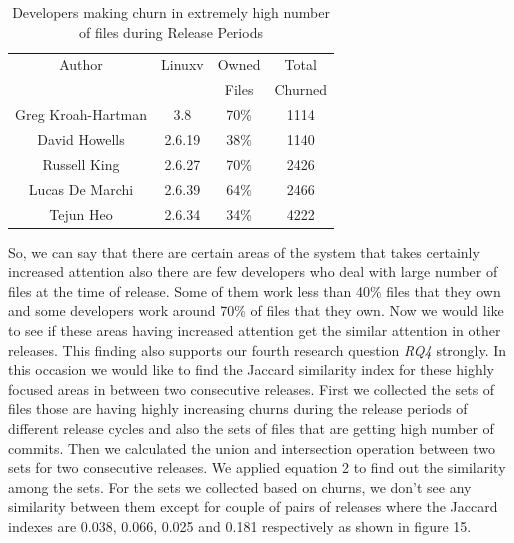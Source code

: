\documentclass{acm_proc_article-sp}
\begin{document}
\begin{table}[ht]
\caption{Developers making churn in extremely high number of files during Release Periods}  %
\centering 						%
\begin{tabular}{c c c c}				%
\hline\hline						%
Author 						& Linuxv		& Owned 			& Total \\
							& 			& Files				& Churned \\ [1ex]
\hline 							%
Greg Kroah-Hartman			& 3.8		& 70\%				& 1114\\
David Howells				& 2.6.19		& 38\%				& 1140\\
Russell King					& 2.6.27		& 70\%				& 2426\\
Lucas De Marchi				& 2.6.39		& 64\% 				& 2466\\
Tejun Heo					& 2.6.34		& 34\% 				& 4222\\
[1ex]							%
\hline 							%
\end{tabular}
\label{table:nonlin} 				%
\end{table}

So, we can say that there are certain areas of the system that takes certainly increased attention also there are few developers who deal with large number of files at the time of release. Some of them work less than 40\% files that they own and some developers work around 70\% of files that they own. Now we would like to see if these areas having increased attention get the similar attention in other releases. This finding also supports our fourth research question \textit{RQ4} strongly. In this occasion we would like to find the Jaccard similarity index for these highly focused areas in between two consecutive releases. First we collected the sets of files those are having highly increasing churns during the release periods of different release cycles and also the sets of files that are getting high number of commits. Then we calculated the union and intersection operation between two sets for two consecutive releases. We applied equation 2 to find out the similarity among the sets. For the sets we collected based on churns, we don't see any similarity between them except for couple of pairs of releases where the Jaccard indexes are 0.038, 0.066, 0.025 and 0.181 respectively as shown in figure 15.
\end{document}
